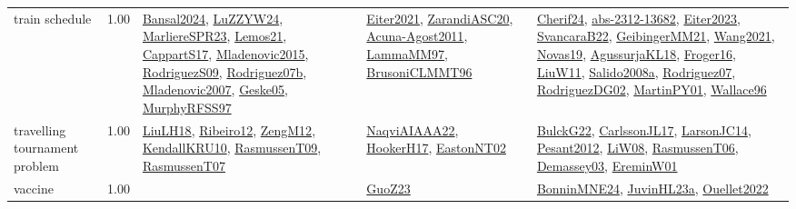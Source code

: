 {\begin{longtable}{p{3cm}r>{\raggedright\arraybackslash}p{6cm}>{\raggedright\arraybackslash}p{6cm}>{\raggedright\arraybackslash}p{8cm}}
\index{train schedule}\index{ApplicationAreas!train schedule}train schedule &  1.00 & \hyperref[detail:Bansal2024]{Bansal2024}, \hyperref[detail:LuZZYW24]{LuZZYW24}, \hyperref[detail:MarliereSPR23]{MarliereSPR23}, \hyperref[detail:Lemos21]{Lemos21}, \hyperref[detail:CappartS17]{CappartS17}, \hyperref[detail:Mladenovic2015]{Mladenovic2015}, \hyperref[detail:RodriguezS09]{RodriguezS09}, \hyperref[detail:Rodriguez07b]{Rodriguez07b}, \hyperref[detail:Mladenovic2007]{Mladenovic2007}, \hyperref[detail:Geske05]{Geske05}, \hyperref[detail:MurphyRFSS97]{MurphyRFSS97} & \hyperref[detail:Eiter2021]{Eiter2021}, \hyperref[detail:ZarandiASC20]{ZarandiASC20}, \hyperref[detail:Acuna-Agost2011]{Acuna-Agost2011}, \hyperref[detail:LammaMM97]{LammaMM97}, \hyperref[detail:BrusoniCLMMT96]{BrusoniCLMMT96} & \hyperref[detail:Cherif24]{Cherif24}, \hyperref[detail:abs-2312-13682]{abs-2312-13682}, \hyperref[detail:Eiter2023]{Eiter2023}, \hyperref[detail:SvancaraB22]{SvancaraB22}, \hyperref[detail:GeibingerMM21]{GeibingerMM21}, \hyperref[detail:Wang2021]{Wang2021}, \hyperref[detail:Novas19]{Novas19}, \hyperref[detail:AgussurjaKL18]{AgussurjaKL18}, \hyperref[detail:Froger16]{Froger16}, \hyperref[detail:LiuW11]{LiuW11}, \hyperref[detail:Salido2008a]{Salido2008a}, \hyperref[detail:Rodriguez07]{Rodriguez07}, \hyperref[detail:RodriguezDG02]{RodriguezDG02}, \hyperref[detail:MartinPY01]{MartinPY01}, \hyperref[detail:Wallace96]{Wallace96}\\
\index{travelling tournament problem}\index{ApplicationAreas!travelling tournament problem}travelling tournament problem &  1.00 & \hyperref[detail:LiuLH18]{LiuLH18}, \hyperref[detail:Ribeiro12]{Ribeiro12}, \hyperref[detail:ZengM12]{ZengM12}, \hyperref[detail:KendallKRU10]{KendallKRU10}, \hyperref[detail:RasmussenT09]{RasmussenT09}, \hyperref[detail:RasmussenT07]{RasmussenT07} & \hyperref[detail:NaqviAIAAA22]{NaqviAIAAA22}, \hyperref[detail:HookerH17]{HookerH17}, \hyperref[detail:EastonNT02]{EastonNT02} & \hyperref[detail:BulckG22]{BulckG22}, \hyperref[detail:CarlssonJL17]{CarlssonJL17}, \hyperref[detail:LarsonJC14]{LarsonJC14}, \hyperref[detail:Pesant2012]{Pesant2012}, \hyperref[detail:LiW08]{LiW08}, \hyperref[detail:RasmussenT06]{RasmussenT06}, \hyperref[detail:Demassey03]{Demassey03}, \hyperref[detail:EreminW01]{EreminW01}\\
\index{vaccine}\index{ApplicationAreas!vaccine}vaccine &  1.00 &  & \hyperref[detail:GuoZ23]{GuoZ23} & \hyperref[detail:BonninMNE24]{BonninMNE24}, \hyperref[detail:JuvinHL23a]{JuvinHL23a}, \hyperref[detail:Ouellet2022]{Ouellet2022}\\

\end{longtable}}
